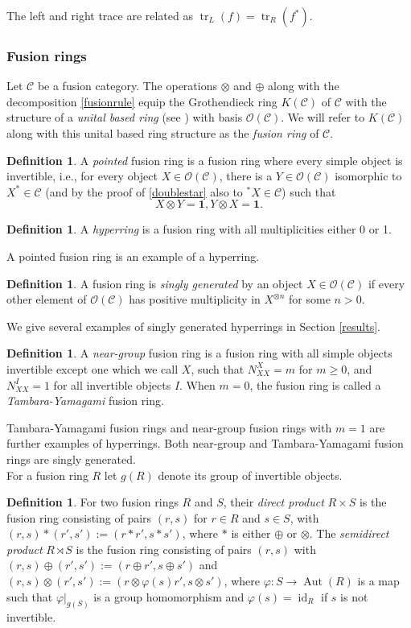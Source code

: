 \documentclass[a4paper, 10pt]{book}
\theoremstyle{definition}
\newtheorem{Def}[theorem]{Definition}
\numberwithin{equation}{chapter}
\newcommand\tr{\operatorname{tr}}
\newcommand\id{\operatorname{id}}
\newcommand\ot{\otimes}
\newcommand\Aut{\operatorname{Aut}}
\newcommand\C{\mathcal C}
\newcommand\OO{\mathcal O}
\newcommand{\ra}\rightarrow
\newcommand\one{\mathbf{1}}
\newcommand\semidir\rtimes
\begin{document}
 
The left and right trace are related as $\tr_L(f) = \tr_R(f^*)$.
\subsubsection{Fusion rings}
Let $\C$ be a fusion category. The operations $\otimes$ and $\oplus$ along with the decomposition \eqref{fusionrule} equip the Grothendieck ring $K(\C)$ of $\C$ with the structure of a \textit{unital based ring} (see \cite[Section 3.1]{EGNO}) with basis $\OO(\C)$. We will refer to $K(\C)$ along with this unital based ring structure as the \textit{fusion ring} of $\C$.
\begin{Def}
A \textit{pointed} fusion ring is a fusion ring where every simple object is invertible, i.e., for every object $X\in \OO(\C)$, there is a $Y\in \OO(\C)$ isomorphic to $X^*\in \C$ (and by the proof of \ref{doublestar} also to ${}^*X\in \C$) such that \begin{equation*}
	X\ot Y = \one, Y\ot X = \one.
\end{equation*} 
\end{Def}

\begin{Def}
A \textit{hyperring} is a fusion ring with all multiplicities either 0 or 1.
\end{Def}
A pointed fusion ring is an example of a hyperring.

\begin{Def}
A fusion ring is \textit{singly generated} by an object $X\in \OO(\C)$ if every other element of $\OO(\C)$ has positive multiplicity in $X^{\otimes n}$ for some $n>0$.
\end{Def}
We give several examples of singly generated hyperrings in Section \ref{results}.

\begin{Def}
 A \textit{near-group} fusion ring is a fusion ring with all simple objects invertible except one which we call $X$, such that $N^X_{XX} = m$ for $m\geq	0$, and $N^{I}_{XX} =1$ for all invertible objects $I$. When $m=0$, the fusion ring is called a \textit{Tambara-Yamagami} fusion ring. 
 \end{Def} 
Tambara-Yamagami fusion rings and near-group fusion rings with $m=1$ are further examples of hyperrings. Both near-group and Tambara-Yamagami fusion rings are singly generated.\\
For a fusion ring $R$ let $g(R)$ denote its group of invertible objects.
\begin{Def}
For two fusion rings $R$ and $S$, their \textit{direct product} $R\times S$ is the fusion ring consisting of pairs $(r, s)$ for $r \in R$ and $s\in S$, with $(r, s)* (r', s') := (r* r', s* s')$, where $*$ is either $\oplus$ or $\ot$. The \textit{semidirect product} $R\semidir S$ is the fusion ring consisting of pairs $(r, s)$ with $(r, s)\oplus (r', s') := (r\oplus r', s\oplus s')$ and $(r, s)\ot (r', s') := (r\ot \varphi(s)r', s \ot s')$, where $\varphi:S\ra \Aut(R)$ is a map such that $\varphi|_{g(S)}$ is a group homomorphism and $\varphi(s) = \id_R$ if $s$ is not invertible. 
\end{Def}
\end{document}
